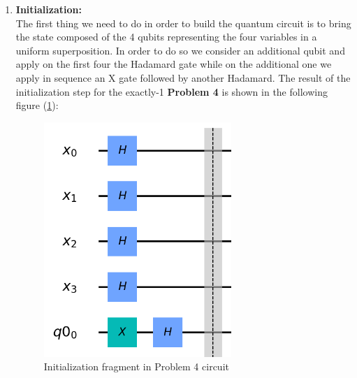 \documentclass[english]{article}
\begin{document}
				\begin{enumerate}
					\item \textbf{Initialization:}\\
						The first thing we need to do in order to build the quantum circuit is to bring the state composed of the 4 qubits representing the four variables in a uniform superposition. In order to do so we consider an additional qubit and apply on the first four the Hadamard gate while on the additional one we apply in sequence an X gate followed by another Hadamard. The result of the initialization step for the exactly-1 \textbf{Problem 4} is shown in the following figure (\ref{fig:initializationCircuit}):
						\begin{figure}[h]
							\centering
							\includegraphics[scale=0.6]{Initialization_Circuit.png}
							\caption{
								\label{fig:initializationCircuit}
								Initialization fragment in Problem 4 circuit
							}
						\end{figure}
					

\end{enumerate}
\end{document}
